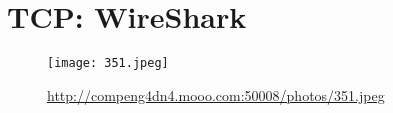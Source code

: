 \section*{TCP: WireShark}

\begin{figure}[htp]
\centering
\caption[mooo]{\url{http://compeng4dn4.mooo.com:50008/photos/351.jpeg}}
\texttt{[image: 351.jpeg]}
\end{figure}